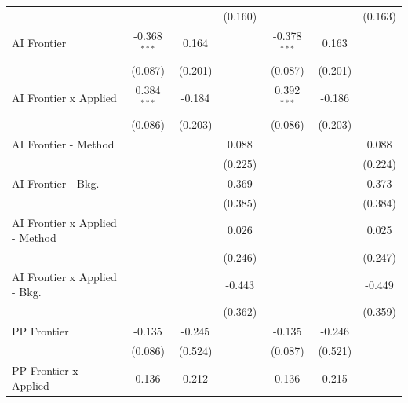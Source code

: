 \begin{tabular}{lcccccc}
                                  &                &                & (0.160)        &                &                & (0.163)\\   
   AI Frontier                    & -0.368$^{***}$ & 0.164          &                & -0.378$^{***}$ & 0.163          &   \\   
                                  & (0.087)        & (0.201)        &                & (0.087)        & (0.201)        &   \\   
   AI Frontier x Applied          & 0.384$^{***}$  & -0.184         &                & 0.392$^{***}$  & -0.186         &   \\   
                                  & (0.086)        & (0.203)        &                & (0.086)        & (0.203)        &   \\   
   AI Frontier - Method           &                &                & 0.088          &                &                & 0.088\\   
                                  &                &                & (0.225)        &                &                & (0.224)\\   
   AI Frontier - Bkg.             &                &                & 0.369          &                &                & 0.373\\   
                                  &                &                & (0.385)        &                &                & (0.384)\\   
   AI Frontier x Applied - Method &                &                & 0.026          &                &                & 0.025\\   
                                  &                &                & (0.246)        &                &                & (0.247)\\   
   AI Frontier x Applied - Bkg.   &                &                & -0.443         &                &                & -0.449\\   
                                  &                &                & (0.362)        &                &                & (0.359)\\   
   PP Frontier                    & -0.135         & -0.245         &                & -0.135         & -0.246         &   \\   
                                  & (0.086)        & (0.524)        &                & (0.087)        & (0.521)        &   \\   
   PP Frontier x Applied          & 0.136          & 0.212          &                & 0.136          & 0.215          &   \\   

\end{tabular}
